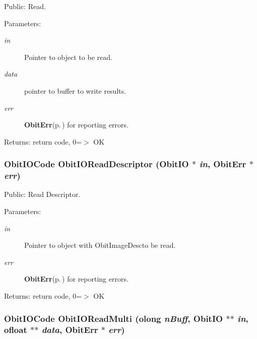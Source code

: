 Public: Read. 

\begin{Desc}
\item[Parameters:]
\begin{description}
\item[{\em in}]Pointer to object to be read. \item[{\em data}]pointer to buffer to write results. \item[{\em err}]{\bf Obit\-Err}{\rm (p.\,\pageref{structObitErr})} for reporting errors. \end{description}
\end{Desc}
\begin{Desc}
\item[Returns:]return code, 0=$>$ OK \end{Desc}
\subsubsection{\setlength{\rightskip}{0pt plus 5cm}Obit\-IOCode Obit\-IORead\-Descriptor ({\bf Obit\-IO} $\ast$ {\em in}, {\bf Obit\-Err} $\ast$ {\em err})}\label{ObitIO_8h_a49}


Public: Read Descriptor. 

\begin{Desc}
\item[Parameters:]
\begin{description}
\item[{\em in}]Pointer to object with Obit\-Image\-Descto be read. \item[{\em err}]{\bf Obit\-Err}{\rm (p.\,\pageref{structObitErr})} for reporting errors. \end{description}
\end{Desc}
\begin{Desc}
\item[Returns:]return code, 0=$>$ OK \end{Desc}
\subsubsection{\setlength{\rightskip}{0pt plus 5cm}Obit\-IOCode Obit\-IORead\-Multi ({\bf olong} {\em n\-Buff}, {\bf Obit\-IO} $\ast$$\ast$ {\em in}, {\bf ofloat} $\ast$$\ast$ {\em data}, {\bf Obit\-Err} $\ast$ {\em err})}\label{ObitIO_8h_a39}



